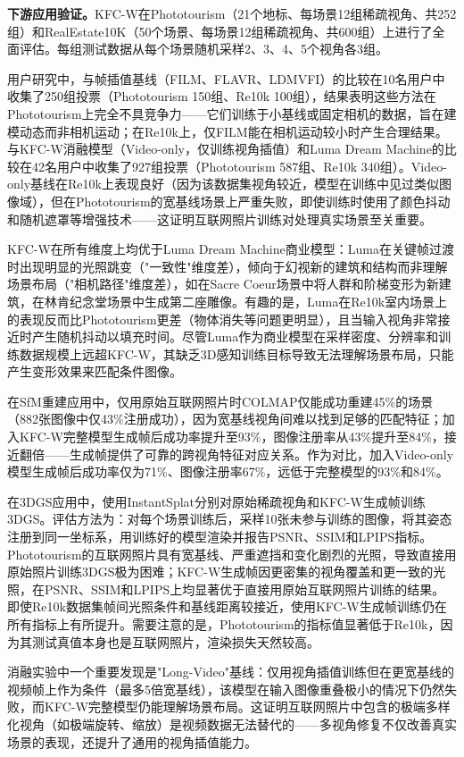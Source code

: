 \textbf{下游应用验证。}KFC-W在Phototourism（21个地标、每场景12组稀疏视角、共252组）和RealEstate10K（50个场景、每场景12组稀疏视角、共600组）上进行了全面评估。每组测试数据从每个场景随机采样2、3、4、5个视角各3组。

用户研究中，与帧插值基线（FILM、FLAVR、LDMVFI）的比较在10名用户中收集了250组投票（Phototourism 150组、Re10k 100组），结果表明这些方法在Phototourism上完全不具竞争力——它们训练于小基线或固定相机的数据，旨在建模动态而非相机运动；在Re10k上，仅FILM能在相机运动较小时产生合理结果。与KFC-W消融模型（Video-only，仅训练视角插值）和Luma Dream Machine的比较在42名用户中收集了927组投票（Phototourism 587组、Re10k 340组）。Video-only基线在Re10k上表现良好（因为该数据集视角较近，模型在训练中见过类似图像域），但在Phototourism的宽基线场景上严重失败，即使训练时使用了颜色抖动和随机遮罩等增强技术——这证明互联网照片训练对处理真实场景至关重要。

KFC-W在所有维度上均优于Luma Dream Machine商业模型：Luma在关键帧过渡时出现明显的光照跳变（"一致性"维度差），倾向于幻视新的建筑和结构而非理解场景布局（"相机路径"维度差），如在Sacre Coeur场景中将人群和阶梯变形为新建筑，在林肯纪念堂场景中生成第二座雕像。有趣的是，Luma在Re10k室内场景上的表现反而比Phototourism更差（物体消失等问题更明显），且当输入视角非常接近时产生随机抖动以填充时间。尽管Luma作为商业模型在采样密度、分辨率和训练数据规模上远超KFC-W，其缺乏3D感知训练目标导致无法理解场景布局，只能产生变形效果来匹配条件图像。

在SfM重建应用中，仅用原始互联网照片时COLMAP仅能成功重建45\%的场景（882张图像中仅43\%注册成功），因为宽基线视角间难以找到足够的匹配特征；加入KFC-W完整模型生成帧后成功率提升至93\%，图像注册率从43\%提升至84\%，接近翻倍——生成帧提供了可靠的跨视角特征对应关系。作为对比，加入Video-only模型生成帧后成功率仅为71\%、图像注册率67\%，远低于完整模型的93\%和84\%。

在3DGS应用中，使用InstantSplat分别对原始稀疏视角和KFC-W生成帧训练3DGS。评估方法为：对每个场景训练后，采样10张未参与训练的图像，将其姿态注册到同一坐标系，用训练好的模型渲染并报告PSNR、SSIM和LPIPS指标。Phototourism的互联网照片具有宽基线、严重遮挡和变化剧烈的光照，导致直接用原始照片训练3DGS极为困难；KFC-W生成帧因更密集的视角覆盖和更一致的光照，在PSNR、SSIM和LPIPS上均显著优于直接用原始互联网照片训练的结果。即使Re10k数据集帧间光照条件和基线距离较接近，使用KFC-W生成帧训练仍在所有指标上有所提升。需要注意的是，Phototourism的指标值显著低于Re10k，因为其测试真值本身也是互联网照片，渲染损失天然较高。

消融实验中一个重要发现是"Long-Video"基线：仅用视角插值训练但在更宽基线的视频帧上作为条件（最多5倍宽基线），该模型在输入图像重叠极小的情况下仍然失败，而KFC-W完整模型仍能理解场景布局。这证明互联网照片中包含的极端多样化视角（如极端旋转、缩放）是视频数据无法替代的——多视角修复不仅改善真实场景的表现，还提升了通用的视角插值能力。

